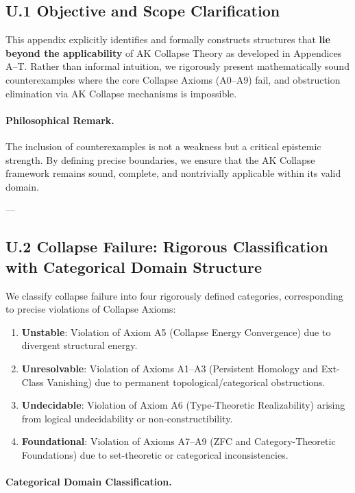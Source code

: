 \documentclass[11pt]{article}
\begin{document}
\subsection*{U.1 Objective and Scope Clarification}

This appendix explicitly identifies and formally constructs structures that \textbf{lie beyond the applicability} of AK Collapse Theory as developed in Appendices A–T.  
Rather than informal intuition, we rigorously present mathematically sound counterexamples where the core Collapse Axioms (A0–A9) fail, and obstruction elimination via AK Collapse mechanisms is impossible.

\paragraph{Philosophical Remark.}  
The inclusion of counterexamples is not a weakness but a critical epistemic strength.  
By defining precise boundaries, we ensure that the AK Collapse framework remains sound, complete, and nontrivially applicable within its valid domain.

---

\subsection*{U.2 Collapse Failure: Rigorous Classification with Categorical Domain Structure}

We classify collapse failure into four rigorously defined categories, corresponding to precise violations of Collapse Axioms:

\begin{enumerate}
    \item \textbf{Unstable}: Violation of Axiom A5 (Collapse Energy Convergence) due to divergent structural energy.
    \item \textbf{Unresolvable}: Violation of Axioms A1–A3 (Persistent Homology and Ext-Class Vanishing) due to permanent topological/categorical obstructions.
    \item \textbf{Undecidable}: Violation of Axiom A6 (Type-Theoretic Realizability) arising from logical undecidability or non-constructibility.
    \item \textbf{Foundational}: Violation of Axioms A7–A9 (ZFC and Category-Theoretic Foundations) due to set-theoretic or categorical inconsistencies.
\end{enumerate}

\paragraph{Categorical Domain Classification.}
\end{document}
